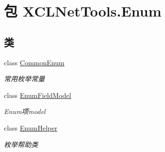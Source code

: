 \hypertarget{namespace_x_c_l_net_tools_1_1_enum}{\section{包 X\-C\-L\-Net\-Tools.\-Enum}
\label{namespace_x_c_l_net_tools_1_1_enum}
}
\subsection*{类}
\begin{DoxyCompactItemize}
\item 
class \hyperlink{class_x_c_l_net_tools_1_1_enum_1_1_common_enum}{Common\-Enum}
\begin{DoxyCompactList}\small\item\em 常用枚举常量 \end{DoxyCompactList}\item 
class \hyperlink{class_x_c_l_net_tools_1_1_enum_1_1_enum_field_model}{Enum\-Field\-Model}
\begin{DoxyCompactList}\small\item\em Enum项model \end{DoxyCompactList}\item 
class \hyperlink{class_x_c_l_net_tools_1_1_enum_1_1_enum_helper}{Enum\-Helper}
\begin{DoxyCompactList}\small\item\em 枚举帮助类 \end{DoxyCompactList}\end{DoxyCompactItemize}
